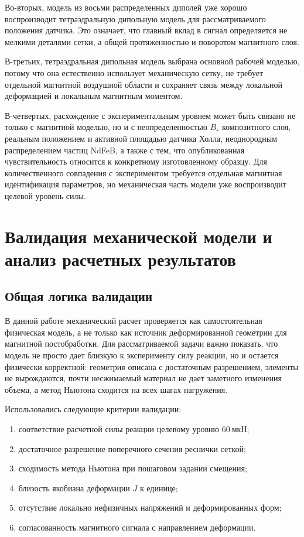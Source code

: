 \documentclass[14pt,a4paper]{extarticle}
\newcommand{\numberedsection}[1]{%
    \clearpage
    \section{#1}%
}
\begin{document}
Во-вторых, модель из восьми распределенных диполей уже хорошо воспроизводит тетраэдральную дипольную модель для рассматриваемого положения датчика. Это означает, что главный вклад в сигнал определяется не мелкими деталями сетки, а общей протяженностью и поворотом магнитного слоя.

В-третьих, тетраэдральная дипольная модель выбрана основной рабочей моделью, потому что она естественно использует механическую сетку, не требует отдельной магнитной воздушной области и сохраняет связь между локальной деформацией и локальным магнитным моментом.

В-четвертых, расхождение с экспериментальным уровнем может быть связано не только с магнитной моделью, но и с неопределенностью \(B_r\) композитного слоя, реальным положением и активной площадью датчика Холла, неоднородным распределением частиц NdFeB, а также с тем, что опубликованная чувствительность относится к конкретному изготовленному образцу. Для количественного совпадения с экспериментом требуется отдельная магнитная идентификация параметров, но механическая часть модели уже воспроизводит целевой уровень силы.



\numberedsection{Валидация механической модели и анализ расчетных результатов}

\subsection{Общая логика валидации}

В данной работе механический расчет проверяется как самостоятельная физическая модель, а не только как источник деформированной геометрии для магнитной постобработки. Для рассматриваемой задачи важно показать, что модель не просто дает близкую к эксперименту силу реакции, но и остается физически корректной: геометрия описана с достаточным разрешением, элементы не вырождаются, почти несжимаемый материал не дает заметного изменения объема, а метод Ньютона сходится на всех шагах нагружения.

Использовались следующие критерии валидации:
\begin{enumerate}
    \item соответствие расчетной силы реакции целевому уровню \(60~\text{мкН}\);
    \item достаточное разрешение поперечного сечения реснички сеткой;
    \item сходимость метода Ньютона при пошаговом задании смещения;
    \item близость якобиана деформации \(J\) к единице;
    \item отсутствие локально нефизичных напряжений и деформированных форм;
    \item согласованность магнитного сигнала с направлением деформации.
\end{enumerate}
\end{document}

